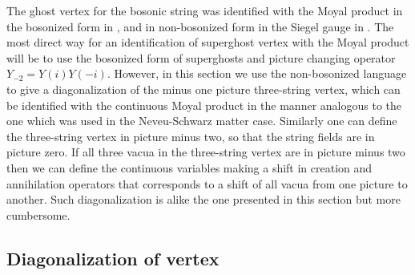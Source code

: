 \documentclass[a4paper,12pt]{article}
\begin{document}
The ghost vertex for the bosonic string was identified with
the Moyal product in the bosonized form in \cite{0204260}, \cite{0207174}
and in non-bosonized form in the Siegel gauge in \cite{0205107}.
The most direct way for an identification of superghost vertex with
the Moyal product will be to use the bosonized form of superghosts
and picture changing operator $Y_{-2}=Y(i)Y(-i)$.
However, in this section we use the non-bosonized language
to give a diagonalization of the minus one picture three-string
vertex,
which can be identified
with the continuous Moyal product in the manner analogous
to the one which was used in the Neveu-Schwarz matter case.
Similarly one can define the three-string vertex
in picture minus two, so that the string fields are in picture
zero. If all three vacua in the three-string
vertex are in picture minus two then we can
define the continuous variables making a shift in creation
and annihilation operators that corresponds to a shift
of all vacua from one picture to another.
Such diagonalization is alike the one
presented in this section but more cumbersome.

\subsection{Diagonalization of vertex}
\end{document}
